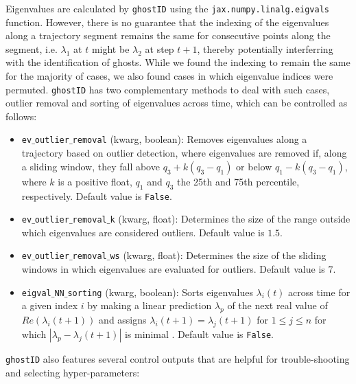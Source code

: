 \documentclass{article}
\theoremstyle{definition}
\begin{document}
\begin{refsection}
Eigenvalues are calculated by {\tt ghostID} using the {\tt jax.numpy.linalg.eigvals} function. However, there is no guarantee that the indexing of the eigenvalues along a trajectory segment remains the same for consecutive points along the segment, i.e. $\lambda_1$ at $t$ might be $\lambda_2$ at step $t+1$, thereby potentially interferring with the identification of ghosts. While we found the indexing to remain the same for the majority of cases, we also found cases in which eigenvalue indices were permuted. {\tt ghostID} has two complementary methods to deal with such cases, outlier removal and sorting of eigenvalues across time, which can be controlled as follows:

\begin{itemize}
\item {\tt ev$\_$outlier$\_$removal} (kwarg, boolean): Removes eigenvalues along a trajectory based on outlier detection, where eigenvalues are removed if, along a sliding window, they fall above $q_3 + k (q_3 - q_1)$ or below $q_1 - k (q_3 - q_1)$, where $k$ is a positive float, $q_1$ and $q_3$ the 25th and 75th percentile, respectively. Default value is {\tt False}.
\item {\tt ev$\_$outlier$\_$removal$\_$k} (kwarg, float): Determines the size of the range outside which eigenvalues are considered outliers. Default value is $1.5$.
\item {\tt ev$\_$outlier$\_$removal$\_$ws} (kwarg, float): Determines the size of the sliding windows in which eigenvalues are evaluated for outliers. Default value is $7$.
\item {\tt eigval$\_$NN$\_$sorting} (kwarg, boolean): Sorts eigenvalues $\lambda_i(t)$ across time for a given index $i$ by making a linear prediction $\lambda_p$ of the next real value of $Re(\lambda_i(t+1))$ and assigns $\lambda_i(t+1) = \lambda_j(t+1)$ for $1\leq j \leq n$ for which $|\lambda_p-\lambda_j(t+1)|$ is minimal . Default value is {\tt False}.
\end{itemize}

{\tt ghostID} also features several control outputs that are helpful for trouble-shooting and selecting hyper-parameters:


\end{refsection}
\end{document}
